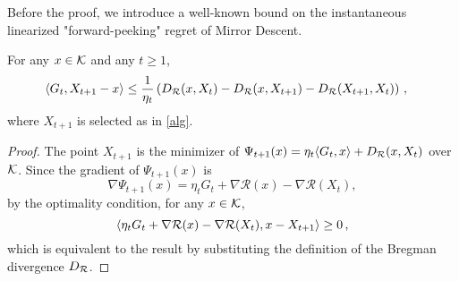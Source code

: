 Before the proof, we introduce a well-known bound on the instantaneous linearized "forward-peeking" regret of Mirror Descent.
\begin{lemma}
\label{lem:mdlinregret}
For any $x \in \mathcal{K}$ and any $t \ge 1$,
\begin{align*}
\MoveEqLeft
\ip{G_t, X_{t+1}-x}
\le \dfrac{1}{\eta_t} \left( \DR(x,X_t)-\DR(x,X_{t+1})-\DR(X_{t+1},X_t) \right)\,,
\end{align*}
where $X_{t+1}$ is selected as in \cref{alg}.
\end{lemma}
\begin{proof}
The point $X_{t+1}$ is the minimizer of
$\Psi_{t+1}(x)=\eta_t \langle G_t,x \rangle+D_{\mathcal{R}}(x,X_t)$ over $\mathcal{K}$. Since the gradient of $\Psi_{t+1}(x)$ is
\[
\nabla \Psi_{t+1}(x) = \eta_t G_t + \nabla\mathcal{R}(x)-\nabla\mathcal{R}(X_t),
\]
by the optimality condition, for any $x \in \mathcal{K}$,
\[
\langle \eta_t G_t + \nabla\mathcal{R}(x)-\nabla\mathcal{R}(X_t), x-X_{t+1} \rangle\ge 0 \,,
\]
which is equivalent to the result by substituting the definition of the Bregman divergence $D_{\mathcal{R}}$.
\end{proof}

